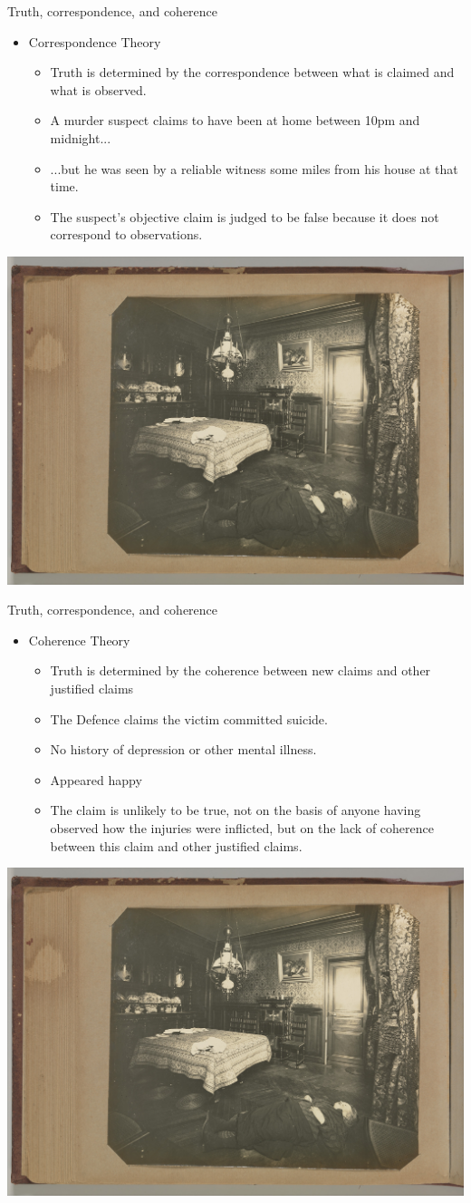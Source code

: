 \documentclass{beamer}
\begin{document}
\begin{frame}{Truth, correspondence, and coherence}
	\begin{itemize}
		\item Correspondence Theory 
		\begin{itemize}
			\item Truth is determined by the correspondence between what is claimed and what is observed.
			\item A murder suspect claims to have been at home between 10pm and midnight...
			\item ...but he was seen by a reliable witness some miles from his house at that time.
			\item The suspect's objective claim is judged to be false because it does not correspond to observations.
		\end{itemize}
	\end{itemize}
	\centerline{\includegraphics[width=.5\textwidth]{pics/victim.jpg}}
\end{frame}

\begin{frame}{Truth, correspondence, and coherence}
	\begin{itemize}
		\item Coherence Theory 
		\begin{itemize}
			\item Truth is determined by the coherence between new claims and other justified claims
			\item The Defence claims the victim committed suicide.
			\item No history of depression or other mental illness.
			\item Appeared happy
			\item The claim is unlikely to be true, not on the basis of anyone having observed how the injuries were inflicted, but on the lack of coherence between this claim and other justified claims.
		\end{itemize}
	\end{itemize}
	\centerline{\includegraphics[width=.5\textwidth]{pics/victim.jpg}}
\end{frame}
\end{document}
